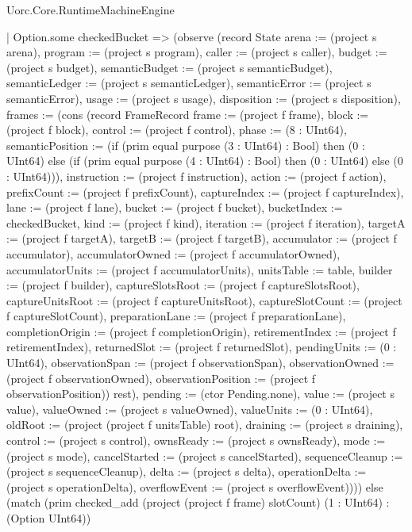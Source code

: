 \begin{lexlean}{Uorc.Core.RuntimeMachineEngine}
\begin{semanticmodule}
{      | Option.some checkedBucket => (observe (record State {arena := (project s arena), program := (project s program), caller := (project s caller), budget := (project s budget), semanticBudget := (project s semanticBudget), semanticLedger := (project s semanticLedger), semanticError := (project s semanticError), usage := (project s usage), disposition := (project s disposition), frames := (cons (record FrameRecord {frame := (project f frame), block := (project f block), control := (project f control), phase := (8 : UInt64), semanticPosition := (if (prim equal purpose (3 : UInt64) : Bool) then (0 : UInt64) else (if (prim equal purpose (4 : UInt64) : Bool) then (0 : UInt64) else (0 : UInt64))), instruction := (project f instruction), action := (project f action), prefixCount := (project f prefixCount), captureIndex := (project f captureIndex), lane := (project f lane), bucket := (project f bucket), bucketIndex := checkedBucket, kind := (project f kind), iteration := (project f iteration), targetA := (project f targetA), targetB := (project f targetB), accumulator := (project f accumulator), accumulatorOwned := (project f accumulatorOwned), accumulatorUnits := (project f accumulatorUnits), unitsTable := table, builder := (project f builder), captureSlotsRoot := (project f captureSlotsRoot), captureUnitsRoot := (project f captureUnitsRoot), captureSlotCount := (project f captureSlotCount), preparationLane := (project f preparationLane), completionOrigin := (project f completionOrigin), retirementIndex := (project f retirementIndex), returnedSlot := (project f returnedSlot), pendingUnits := (0 : UInt64), observationSpan := (project f observationSpan), observationOwned := (project f observationOwned), observationPosition := (project f observationPosition)}) rest), pending := (ctor Pending.none), value := (project s value), valueOwned := (project s valueOwned), valueUnits := (0 : UInt64), oldRoot := (project (project f unitsTable) root), draining := (project s draining), control := (project s control), ownsReady := (project s ownsReady), mode := (project s mode), cancelStarted := (project s cancelStarted), sequenceCleanup := (project s sequenceCleanup), delta := (project s delta), operationDelta := (project s operationDelta), overflowEvent := (project s overflowEvent)}))) else (match (prim checked_add (project (project f frame) slotCount) (1 : UInt64) : (Option UInt64))
}
\end{semanticmodule}
\end{lexlean}
